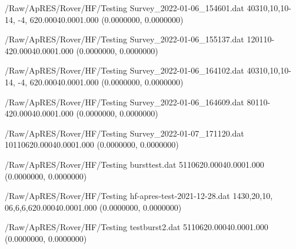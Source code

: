 \hfaprestable
{/Raw/ApRES/Rover/HF/Testing}%
{Survey\_2022-01-06\_154601.dat}%
{40}{3}{10,10,10}{-14, -4,  6}{20.000}{40.000}{1.000}%
{ (0.0000000, 0.0000000)}%
{}%
{}%

\hfaprestable
{/Raw/ApRES/Rover/HF/Testing}%
{Survey\_2022-01-06\_155137.dat}%
{120}{1}{10}{-4}{20.000}{40.000}{1.000}%
{ (0.0000000, 0.0000000)}%
{}%
{}%

\hfaprestable
{/Raw/ApRES/Rover/HF/Testing}%
{Survey\_2022-01-06\_164102.dat}%
{40}{3}{10,10,10}{-14, -4,  6}{20.000}{40.000}{1.000}%
{ (0.0000000, 0.0000000)}%
{}%
{}%

\hfaprestable
{/Raw/ApRES/Rover/HF/Testing}%
{Survey\_2022-01-06\_164609.dat}%
{80}{1}{10}{-4}{20.000}{40.000}{1.000}%
{ (0.0000000, 0.0000000)}%
{}%
{}%

\hfaprestable
{/Raw/ApRES/Rover/HF/Testing}%
{Survey\_2022-01-07\_171120.dat}%
{10}{1}{10}{6}{20.000}{40.000}{1.000}%
{ (0.0000000, 0.0000000)}%
{}%
{}%

\hfaprestable
{/Raw/ApRES/Rover/HF/Testing}%
{bursttest.dat}%
{5}{1}{10}{6}{20.000}{40.000}{1.000}%
{ (0.0000000, 0.0000000)}%
{}%
{}%

\hfaprestable
{/Raw/ApRES/Rover/HF/Testing}%
{hf-apres-test-2021-12-28.dat}%
{1}{4}{30,20,10, 0}{6,6,6,6}{20.000}{40.000}{1.000}%
{ (0.0000000, 0.0000000)}%
{}%
{}%

\hfaprestable
{/Raw/ApRES/Rover/HF/Testing}%
{testburst2.dat}%
{5}{1}{10}{6}{20.000}{40.000}{1.000}%
{ (0.0000000, 0.0000000)}%
{}%
{}%

